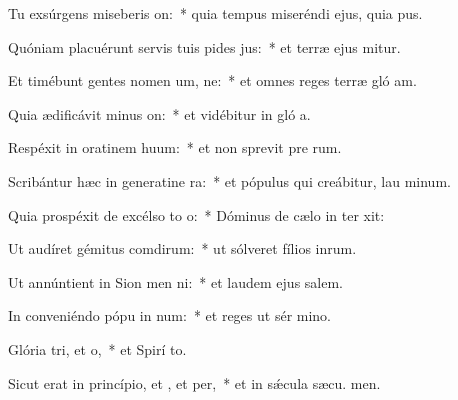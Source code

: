 \item Tu exsúrgens miseberis on:~* quia tempus miseréndi ejus, quia  pus.
\item Quóniam placuérunt servis tuis pides jus:~* et terræ ejus mitur.
\item Et timébunt gentes nomen um, ne:~* et omnes reges terræ gló am.
\item Quia ædificávit minus on:~* et vidébitur in gló a.
\item Respéxit in oratinem huum:~* et non sprevit pre rum.
\item Scribántur hæc in generatine ra:~* et pópulus qui creábitur, lau minum.
\item Quia prospéxit de excélso to o:~* Dóminus de cælo in ter xit:
\item Ut audíret gémitus comdirum:~* ut sólveret fílios inrum.
\item Ut annúntient in Sion men ni:~* et laudem ejus  salem.
\item In conveniéndo pópu in num:~* et reges ut sér mino.
\item Glória tri, et o,~* et Spirí to.
\item Sicut erat in princípio, et , et per,~* et in sǽcula sæcu. men.
